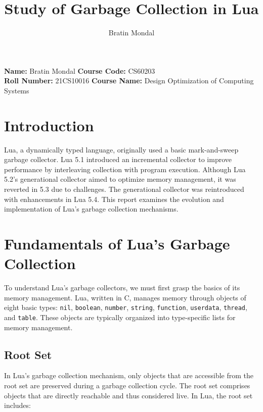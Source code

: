 \documentclass[10pt]{article}
\title{Study of Garbage Collection in Lua}
\author{Bratin Mondal}
\begin{document}
\maketitle

\noindent

\begin{flushleft}
    \textbf{Name:} Bratin Mondal \hfill \textbf{Course Code:} CS60203 \\
    \textbf{Roll Number:} 21CS10016 \hfill \textbf{Course Name:} Design Optimization of Computing Systems
\end{flushleft}


\section{Introduction}
Lua, a dynamically typed language, originally used a basic mark-and-sweep garbage collector. Lua 5.1 introduced an incremental collector to improve performance by interleaving collection with program execution. Although Lua 5.2's generational collector aimed to optimize memory management, it was reverted in 5.3 due to challenges. The generational collector was reintroduced with enhancements in Lua 5.4. This report examines the evolution and implementation of Lua's garbage collection mechanisms.


\section{Fundamentals of Lua's Garbage Collection}

To understand Lua's garbage collectors, we must first grasp the basics of its memory management. Lua, written in C, manages memory through objects of eight basic types: \texttt{nil}, \texttt{boolean}, \texttt{number}, \texttt{string}, \texttt{function}, \texttt{userdata}, \texttt{thread}, and \texttt{table}. These objects are typically organized into type-specific lists for memory management.




\subsection{Root Set} \label{sec:root_set}

In Lua's garbage collection mechanism, only objects that are accessible from the root set are preserved during a garbage collection cycle. The root set comprises objects that are directly reachable and thus considered live. In Lua, the root set includes:
\end{document}
